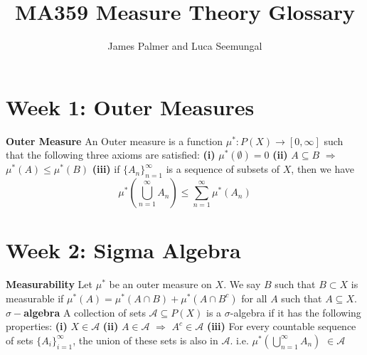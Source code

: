 \documentclass{article}
\title{MA359 Measure Theory Glossary}
\author{James Palmer and Luca Seemungal}
\begin{document}
\maketitle

\section{Week 1: Outer Measures}
\textbf{Outer Measure} An Outer measure is a function $\mu^{*}: P(X) \rightarrow [0, \infty]$ such that the following three axioms are satisfied:
\newline \textbf{(i)} $\mu^{*}(\emptyset) = 0$
\newline \textbf{(ii)} $A \subseteq B$ $\Rightarrow$ $\mu^{*}(A) \leq \mu^{*}(B)$
\newline \textbf{(iii)} if $\{A_n\}_{n=1}^{\infty}$ is a sequence of subsets of $X$, then we have \[ \mu^{*}(\bigcup\limits_{n=1}^{\infty}A_n) \leq \sum_{n=1}^{\infty} \mu^{*}(A_n) \]
\section{Week 2: Sigma Algebra}
\textbf{Measurability} Let $\mu^{*}$ be an outer measure on $X$. We say $B$ such that $B \subset X$ is measurable if $\mu^{*}(A) = \mu^{*}(A \cap B) + \mu^{*}(A \cap B^{c})$ for all $A$ such that $A \subseteq X$.
\newline \newline \textbf{$\sigma-$algebra} A collection of sets $\mathcal{A} \subseteq P(X)$  is a $\sigma$-algebra if it has the following properties:
\newline \textbf{(i)} $X \in \mathcal{A}$
\newline \textbf{(ii)} $A \in \mathcal{A}$ $\Rightarrow$ $A^{c} \in \mathcal{A}$
\newline \textbf{(iii)} For every countable sequence of sets $\{A_i\}_{i=1}^{\infty}$, the union of these sets is also in $\mathcal{A}$. i.e. $\mu^{*}(\bigcup\limits_{n=1}^{\infty}A_n)$ $\in \mathcal{A}$
\end{document}
